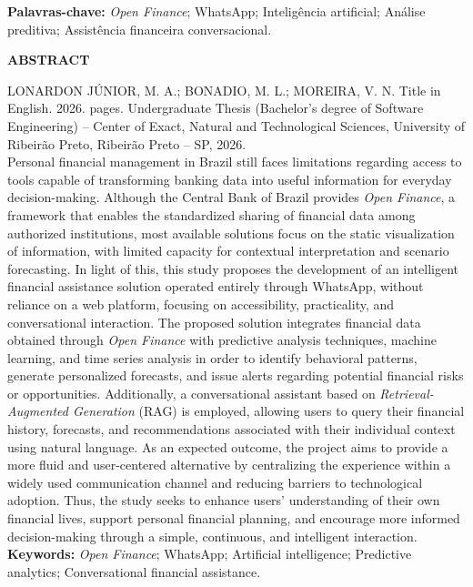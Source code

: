 \noindent\textbf{Palavras-chave:} \textit{Open Finance}; WhatsApp; Inteligência artificial; Análise preditiva; Assistência financeira conversacional.

\newpage
\thispagestyle{empty}
\begin{center}
    \fontsize{14pt}{14pt}\selectfont\bfseries ABSTRACT\\[24pt]
\end{center}

\noindent LONARDON JÚNIOR, M. A.; BONADIO, M. L.; MOREIRA, V. N. Title in English. 2026. \pageref{LastPage} pages. Undergraduate Thesis (Bachelor's degree of Software Engineering) -- Center of Exact, Natural and Technological Sciences, University of Ribeirão Preto, Ribeirão Preto -- SP, 2026.\\[12pt]

Personal financial management in Brazil still faces limitations regarding access to tools capable of transforming banking data into useful information for everyday decision-making. Although the Central Bank of Brazil provides \textit{Open Finance}, a framework that enables the standardized sharing of financial data among authorized institutions, most available solutions focus on the static visualization of information, with limited capacity for contextual interpretation and scenario forecasting. In light of this, this study proposes the development of an intelligent financial assistance solution operated entirely through WhatsApp, without reliance on a web platform, focusing on accessibility, practicality, and conversational interaction. The proposed solution integrates financial data obtained through \textit{Open Finance} with predictive analysis techniques, machine learning, and time series analysis in order to identify behavioral patterns, generate personalized forecasts, and issue alerts regarding potential financial risks or opportunities. Additionally, a conversational assistant based on \textit{Retrieval-Augmented Generation} (RAG) is employed, allowing users to query their financial history, forecasts, and recommendations associated with their individual context using natural language. As an expected outcome, the project aims to provide a more fluid and user-centered alternative by centralizing the experience within a widely used communication channel and reducing barriers to technological adoption. Thus, the study seeks to enhance users' understanding of their own financial lives, support personal financial planning, and encourage more informed decision-making through a simple, continuous, and intelligent interaction.\\[12pt]

\noindent\textbf{Keywords:} \textit{Open Finance}; WhatsApp; Artificial intelligence; Predictive analytics; Conversational financial assistance.

